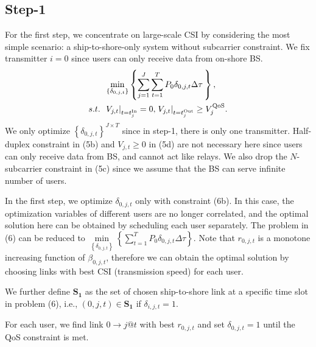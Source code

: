 \documentclass[conference]{IEEEtran}
\begin{document}
 \subsection{Step-1}
 
 For the first step, we concentrate on large-scale CSI by considering the most simple scenario: a ship-to-shore-only system without subcarrier constraint. We fix transmitter $i = 0$ since users can only receive data from on-shore BS. 
 \begin{subequations}
 \begin{align}
 & \mathop {\min }\limits_{\left\{ {{\delta _{0,j,t}}} \right\}} \left\{ {\sum\limits_{j = 1}^J {\sum\limits_{t = 1}^{T} {{P_{0}}\delta _{0,j,t} \Delta \tau } \,} } \right\} ,\\
  {s.t.} \;\; &{{{\left. {{V_{j,t}}} \right|}_{t = t_j^{{\rm{In}}}}} = 0,\left. { {V_{j,t}}} \right|_{t = t_j^{{\rm{Out}}}}} \ge V_j^{\rm{QoS}}.
 \end{align}
 \end{subequations}
 We only optimize $\left\{ {{\delta _{0,j,t}}} \right\}^{J \times T}$ since in step-1, there is only one transmitter. 
 Half-duplex constraint in (5b) and ${V_{j,t}} \ge 0$ in (5d) are not necessary here since users can only receive data from BS, and cannot act like relays. We also drop the $N$-subcarrier constraint in (5c) since we assume that the BS can serve infinite number of users. 
 
 In the first step, we optimize ${\delta _{0,j,t}}$ only with constraint (6b). In this case, the optimization variables of different users are no longer correlated, and the optimal solution here can be obtained by scheduling each user separately. The problem in (6) can be reduced to $\mathop {\min }\limits_{{\left\{ {{\delta _{0,j,t}}} \right\}}} \left\{ {\sum\limits_{t = 1}^T {{P_{0}}\delta _{0,j,t} \Delta \tau } } \right\}$. Note that ${r_{0,j,t}}$ is a monotone increasing function of ${\beta _{0,j,t}}$, therefore we can obtain the optimal solution by choosing links with best CSI (transmission speed) for each user. 
 
 We further define ${{\mathbf{S}}_{\mathbf{1}}}$ as the set of chosen ship-to-shore link at a specific time slot in problem (6), i.e., $\left( {0,j,t} \right) \in {\mathbf{S}}_{\mathbf{1}}$ if ${\delta _{i,j,t} = 1}$. 
 
 For each user, we find link $0 \to j@t$ with best ${r _{0,j,t}}$ and set ${\delta _{0,j,t} = 1}$ until the QoS constraint is met.
 
\end{document}

